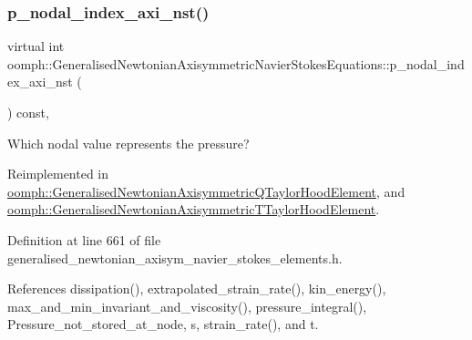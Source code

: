 \mbox{\label{classoomph_1_1GeneralisedNewtonianAxisymmetricNavierStokesEquations_aaaba5e4ead0e847c21fc7e871121400a}} 
\subsubsection{\texorpdfstring{p\+\_\+nodal\+\_\+index\+\_\+axi\+\_\+nst()}{p\_nodal\_index\_axi\_nst()}}
{\footnotesize\ttfamily virtual int oomph\+::\+Generalised\+Newtonian\+Axisymmetric\+Navier\+Stokes\+Equations\+::p\+\_\+nodal\+\_\+index\+\_\+axi\+\_\+nst (\begin{DoxyParamCaption}{ }\end{DoxyParamCaption}) const\hspace{0.3cm}{\ttfamily [inline]}, {\ttfamily [virtual]}}



Which nodal value represents the pressure? 



Reimplemented in \hyperlink{classoomph_1_1GeneralisedNewtonianAxisymmetricQTaylorHoodElement_a466839d0840b8511fa1dec0f60d9b92c}{oomph\+::\+Generalised\+Newtonian\+Axisymmetric\+Q\+Taylor\+Hood\+Element}, and \hyperlink{classoomph_1_1GeneralisedNewtonianAxisymmetricTTaylorHoodElement_a5be1c1c8da5bffcaeedb416349df36d7}{oomph\+::\+Generalised\+Newtonian\+Axisymmetric\+T\+Taylor\+Hood\+Element}.



Definition at line 661 of file generalised\+\_\+newtonian\+\_\+axisym\+\_\+navier\+\_\+stokes\+\_\+elements.\+h.



References dissipation(), extrapolated\+\_\+strain\+\_\+rate(), kin\+\_\+energy(), max\+\_\+and\+\_\+min\+\_\+invariant\+\_\+and\+\_\+viscosity(), pressure\+\_\+integral(), Pressure\+\_\+not\+\_\+stored\+\_\+at\+\_\+node, s, strain\+\_\+rate(), and t.



